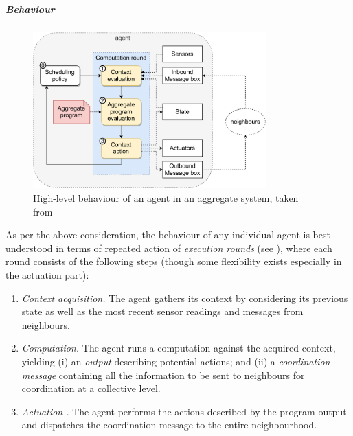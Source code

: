 \subparagraph{Behaviour}
\begin{figure}
    \centering
    \includegraphics[width=0.8\textwidth]{chapters/img/aggregate-agent-control-architecture.pdf}
    \caption[High-level behaviour of an agent in an aggregate system]{High-level behaviour of an agent in an aggregate system, taken from~\cite{casadei2021programming}}\label{fig:aggregate-agent-control-architecture}
\end{figure}
%
As per the above consideration,
 the behaviour of any individual agent is best understood
 in terms of repeated action of \emph{execution rounds} (see ), where each round consists of the following steps (though some flexibility exists especially in the actuation part):
%
\begin{enumerate}
\item \emph{Context acquisition.} The agent gathers its context by considering its previous state as well as the most recent sensor readings and messages from neighbours.
\item \emph{Computation.} The agent runs a computation against the acquired context, 
 yielding (i) an \emph{output} describing potential actions; 
 and (ii) a \emph{coordination message} containing all the information to be sent to neighbours for coordination at a collective level.
\item \emph{Actuation .} The agent performs the actions described by the program output and dispatches the coordination message to the entire neighbourhood.
\end{enumerate}
%

